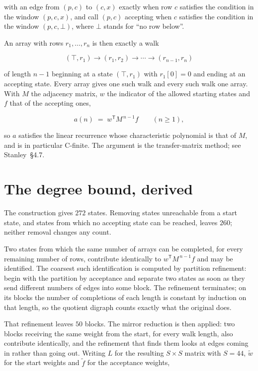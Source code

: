 \documentclass[11pt]{article}
\theoremstyle{definition}
\begin{document}
with an edge from $(p,c)$ to $(c,x)$ exactly when row $c$ satisfies the condition in the window $(p,c,x)$, and call $(p,c)$ accepting when $c$ satisfies the condition in the window $(p,c,\bot)$, where $\bot$ stands for ``no row below''.

An array with rows $r_1,\dots,r_n$ is then exactly a walk

\[(\top,r_1) \to (r_1,r_2) \to \cdots \to (r_{n-1},r_n)\]

of length $n-1$ beginning at a state $(\top,r_1)$ with $r_1[0]=0$ and ending at an accepting state. Every array gives one such walk and every such walk one array. With $M$ the adjacency matrix, $w$ the indicator of the allowed starting states and $f$ that of the accepting ones,

\[a(n) \;=\; w^{\mathsf T} M^{\,n-1} f \qquad (n \ge 1),\]

so $a$ satisfies the linear recurrence whose characteristic polynomial is that of $M$, and is in particular C-finite. The argument is the transfer-matrix method; see Stanley~\S4.7.

\section{The degree bound, derived}

The construction gives $272$ states. Removing states unreachable from a start state, and states from which no accepting state can be reached, leaves $260$; neither removal changes any count.

Two states from which the same number of arrays can be completed, for every remaining number of rows, contribute identically to $w^{\mathsf T}M^{\,n-1}f$ and may be identified. The coarsest such identification is computed by partition refinement: begin with the partition by acceptance and separate two states as soon as they send different numbers of edges into some block. The refinement terminates; on its blocks the number of completions of each length is constant by induction on that length, so the quotient digraph counts exactly what the original does.

That refinement leaves $50$ blocks. The mirror reduction is then applied: two blocks receiving the same weight from the start, for every walk length, also contribute identically, and the refinement that finds them looks at edges coming in rather than going out. Writing $L$ for the resulting $S \times S$ matrix with $S = 44$, $\tilde w$ for the start weights and $\tilde f$ for the acceptance weights,
\end{document}

